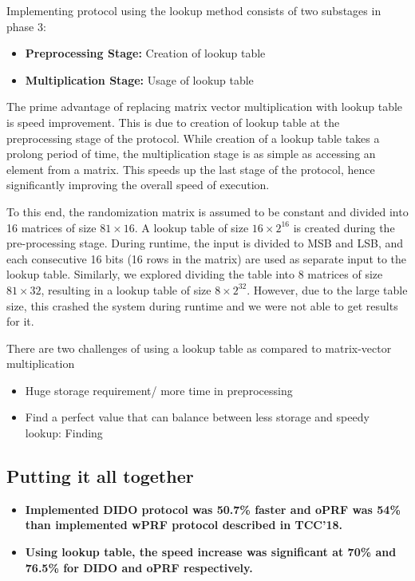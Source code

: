 Implementing protocol using the lookup method consists of two substages in phase 3:\\
\begin{itemize}
	\item{\textbf{Preprocessing Stage: } Creation of lookup table}
	\item{\textbf{Multiplication Stage: } Usage of lookup table}
\end{itemize}


The prime advantage of replacing matrix vector multiplication with lookup table is speed improvement. This is due to creation of lookup table at the preprocessing stage of the protocol. While creation of a lookup table takes a prolong period of time, the multiplication stage is as simple as accessing an element from a matrix. This speeds up the last stage of the protocol, hence significantly improving the overall speed of execution.


To this end, the randomization matrix is assumed to be constant and divided into 16 matrices of size $81 \times 16$. A lookup table of size $16 \times 2^{16}$ is created during the pre-processing stage. During runtime, the input is divided to MSB and LSB, and each consecutive 16 bits (16 rows in the matrix) are used as separate input to the lookup table.  Similarly, we explored dividing the table into 8 matrices of size $81 \times 32$, resulting in a lookup table of size $8  \times 2^{32} $. However, due to the large table size, this crashed the system during runtime and we were not able to get results for it.	

There are two challenges of using a lookup table as compared to matrix-vector multiplication
\begin{itemize}
	\item{Huge storage requirement/ more time in preprocessing}
	\item{Find a perfect value that can balance between less storage and speedy lookup: Finding }
\end{itemize}

\subsection{Putting it all together}

\begin{itemize}
	\item{\textbf{Implemented DIDO protocol was 50.7\% faster and oPRF was 54\% than implemented wPRF protocol described in TCC'18.}}
	\item{\textbf{Using lookup table, the speed increase was significant at 70\% and 76.5\% for DIDO and oPRF respectively.}}
\end{itemize}

